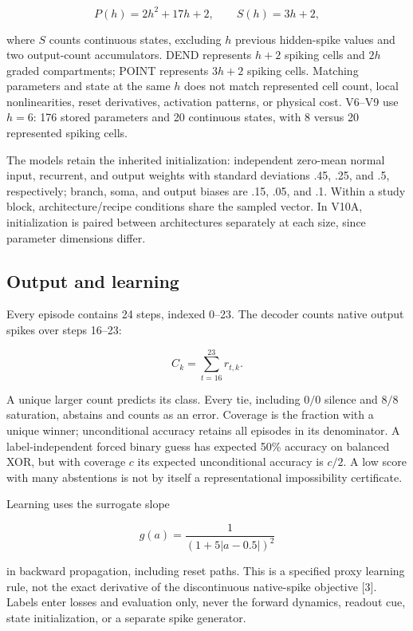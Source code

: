 \documentclass[
  10pt,
]{article}
\begin{document}
\[P(h)=2h^2+17h+2,\qquad S(h)=3h+2,\]

where \(S\) counts continuous states, excluding \(h\) previous
hidden-spike values and two output-count accumulators. DEND represents
\(h+2\) spiking cells and \(2h\) graded compartments; POINT represents
\(3h+2\) spiking cells. Matching parameters and state at the same \(h\)
does not match represented cell count, local nonlinearities, reset
derivatives, activation patterns, or physical cost. V6--V9 use \(h=6\):
176 stored parameters and 20 continuous states, with 8 versus 20
represented spiking cells.

The models retain the inherited initialization: independent zero-mean
normal input, recurrent, and output weights with standard deviations
.45, .25, and .5, respectively; branch, soma, and output biases are .15,
.05, and .1. Within a study block, architecture/recipe conditions share
the sampled vector. In V10A, initialization is paired between
architectures separately at each size, since parameter dimensions
differ.

\subsection{Output and learning}\label{output-and-learning}

Every episode contains 24 steps, indexed 0--23. The decoder counts
native output spikes over steps 16--23:

\[C_k=\sum_{t=16}^{23}r_{t,k}.\]

A unique larger count predicts its class. Every tie, including \(0/0\)
silence and \(8/8\) saturation, abstains and counts as an error.
Coverage is the fraction with a unique winner; unconditional accuracy
retains all episodes in its denominator. A label-independent forced
binary guess has expected 50\% accuracy on balanced XOR, but with
coverage \(c\) its expected unconditional accuracy is \(c/2\). A low
score with many abstentions is not by itself a representational
impossibility certificate.

Learning uses the surrogate slope

\[g(a)=\frac{1}{(1+5|a-0.5|)^2}\]

in backward propagation, including reset paths. This is a specified
proxy learning rule, not the exact derivative of the discontinuous
native-spike objective {[}3{]}. Labels enter losses and evaluation only,
never the forward dynamics, readout cue, state initialization, or a
separate spike generator.
\end{document}
